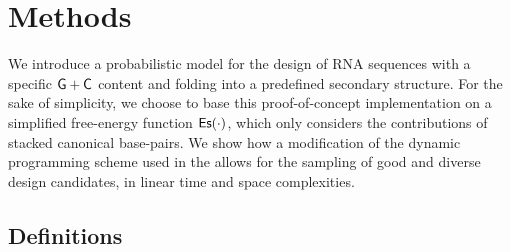 \section{Methods}
\label{sec:methods}



We introduce a probabilistic model for the design of RNA sequences with a specific ${\sf{G}}+{\sf{C}}$ content and folding into a predefined secondary structure.
For the sake of simplicity, we choose to base this proof-of-concept implementation on a simplified free-energy function $\text{{\sf Es}}(\cdot)$, which only considers the contributions of 
stacked canonical base-pairs. We show how a modification of the dynamic programming scheme used in the \RNAmutants allows for the sampling of good and diverse design candidates, in linear time and space complexities.


%
%
\subsection{Definitions}

